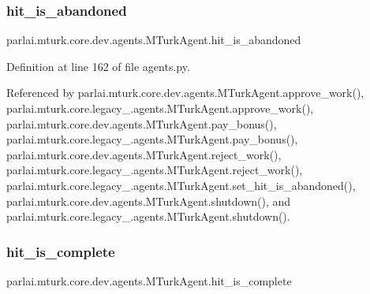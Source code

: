 \mbox{\label{classparlai_1_1mturk_1_1core_1_1dev_1_1agents_1_1MTurkAgent_a6607e617da3bcc0bdc808c0da43f89d3}} 
\subsubsection{\texorpdfstring{hit\+\_\+is\+\_\+abandoned}{hit\_is\_abandoned}}
{\footnotesize\ttfamily parlai.\+mturk.\+core.\+dev.\+agents.\+M\+Turk\+Agent.\+hit\+\_\+is\+\_\+abandoned}



Definition at line 162 of file agents.\+py.



Referenced by parlai.\+mturk.\+core.\+dev.\+agents.\+M\+Turk\+Agent.\+approve\+\_\+work(), parlai.\+mturk.\+core.\+legacy\+\_.\+agents.\+M\+Turk\+Agent.\+approve\+\_\+work(), parlai.\+mturk.\+core.\+dev.\+agents.\+M\+Turk\+Agent.\+pay\+\_\+bonus(), parlai.\+mturk.\+core.\+legacy\+\_.\+agents.\+M\+Turk\+Agent.\+pay\+\_\+bonus(), parlai.\+mturk.\+core.\+dev.\+agents.\+M\+Turk\+Agent.\+reject\+\_\+work(), parlai.\+mturk.\+core.\+legacy\+\_.\+agents.\+M\+Turk\+Agent.\+reject\+\_\+work(), parlai.\+mturk.\+core.\+legacy\+\_.\+agents.\+M\+Turk\+Agent.\+set\+\_\+hit\+\_\+is\+\_\+abandoned(), parlai.\+mturk.\+core.\+dev.\+agents.\+M\+Turk\+Agent.\+shutdown(), and parlai.\+mturk.\+core.\+legacy\+\_.\+agents.\+M\+Turk\+Agent.\+shutdown().

\mbox{\label{classparlai_1_1mturk_1_1core_1_1dev_1_1agents_1_1MTurkAgent_aa7aa7703bbe19e0b7ea232ca21c04214}} 
\subsubsection{\texorpdfstring{hit\+\_\+is\+\_\+complete}{hit\_is\_complete}}
{\footnotesize\ttfamily parlai.\+mturk.\+core.\+dev.\+agents.\+M\+Turk\+Agent.\+hit\+\_\+is\+\_\+complete}



